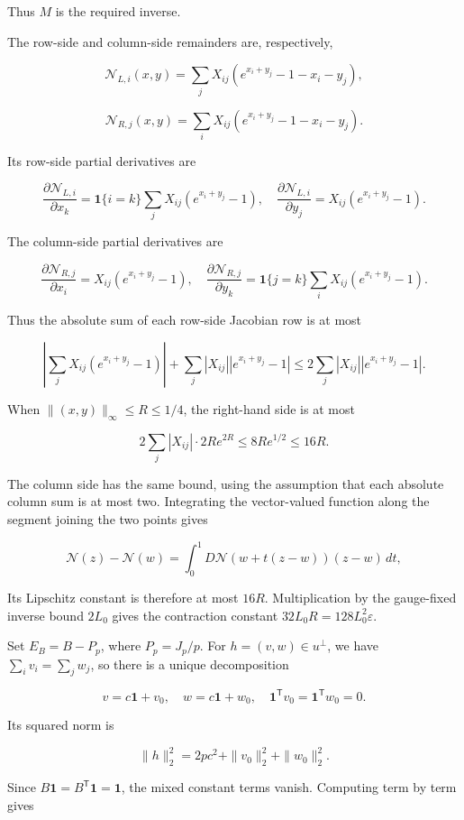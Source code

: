 \documentclass[11pt,a4paper]{article}
\begin{document}
Thus \(M\) is the required inverse.

The row-side and column-side remainders are, respectively,

\[
\mathcal N_{L,i}(x,y)=\sum_jX_{ij}(e^{x_i+y_j}-1-x_i-y_j),
\]

\[
\mathcal N_{R,j}(x,y)=\sum_iX_{ij}(e^{x_i+y_j}-1-x_i-y_j).
\]

Its row-side partial derivatives are

\[
\frac{\partial\mathcal N_{L,i}}{\partial x_k}
=\mathbf1\{i=k\}\sum_jX_{ij}(e^{x_i+y_j}-1),\quad
\frac{\partial\mathcal N_{L,i}}{\partial y_j}=X_{ij}(e^{x_i+y_j}-1).
\]

The column-side partial derivatives are

\[
\frac{\partial\mathcal N_{R,j}}{\partial x_i}=X_{ij}(e^{x_i+y_j}-1),\quad
\frac{\partial\mathcal N_{R,j}}{\partial y_k}
=\mathbf1\{j=k\}\sum_iX_{ij}(e^{x_i+y_j}-1).
\]

Thus the absolute sum of each row-side Jacobian row is at most

\[
\left|\sum_jX_{ij}(e^{x_i+y_j}-1)\right|
+\sum_j|X_{ij}||e^{x_i+y_j}-1|
\le2\sum_j|X_{ij}||e^{x_i+y_j}-1|.
\]

When \(\|(x,y)\|_\infty\le R\le1/4\), the right-hand side is at most

\[
2\sum_j|X_{ij}|\cdot2Re^{2R}\le8Re^{1/2}\le16R.
\]

The column side has the same bound, using the assumption that each absolute column sum is at most two. Integrating the vector-valued function along the segment joining the two points gives

\[
\mathcal N(z)-\mathcal N(w)=\int_0^1D\mathcal N(w+t(z-w))(z-w)\,dt,
\]

Its Lipschitz constant is therefore at most \(16R\). Multiplication by the gauge-fixed inverse bound \(2L_0\) gives the contraction constant \(32L_0R=128L_0^2\varepsilon\).

Set \(E_B=B-P_p\), where \(P_p=J_p/p\). For \(h=(v,w)\in u^\perp\), we have \(\sum_iv_i=\sum_jw_j\), so there is a unique decomposition

\[
v=c\mathbf1+v_0,\quad w=c\mathbf1+w_0,\quad
\mathbf1^{\mathsf T}v_0=\mathbf1^{\mathsf T}w_0=0.
\]

Its squared norm is

\[
\|h\|_2^2=2pc^2+\|v_0\|_2^2+\|w_0\|_2^2.
\]

Since \(B\mathbf1=B^{\mathsf T}\mathbf1=\mathbf1\), the mixed constant terms vanish. Computing term by term gives
\end{document}
